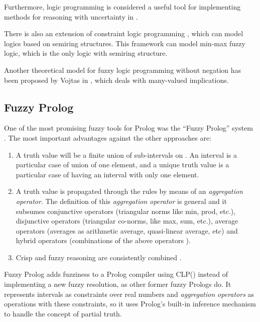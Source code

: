 \documentclass[runningheads,a4paper]{llncs}
\begin{document}
Furthermore, logic programming is considered a useful tool for
implementing methods for reasoning with uncertainty in
\cite{Shapiro83}.

There is also an extension of constraint logic programming
\cite{Bistarelli01}, which can model logics based on semiring
structures. This framework can model min-max fuzzy logic, which is the
only logic with semiring structure.


Another theoretical model for fuzzy logic programming without negation
has been proposed by Vojtas in \cite{Vojt1}, which deals with
many-valued implications.

\subsection{Fuzzy Prolog}
\label{subsec:fuzzy-prolog}


One of the most promising fuzzy tools for Prolog was the ``Fuzzy
Prolog'' system
\cite{Vaucheret_LPAR02,Susana_FSS04}. 
The most important advantages against the other approaches are:
\begin{enumerate}

\item A truth value will be a finite union of sub-intervals on
  . An interval is a particular case of union of one element,
  and a unique truth value is a particular case of having an interval
  with only one element.

\item A truth value is propagated through the rules by means of
  an \emph{aggregation operator}. The definition of this 
  \emph{aggregation operator} is general and 
  it subsumes conjunctive operators (triangular
  norms \cite{Norms00} like min, prod, etc.), disjunctive operators
  \cite{Tri_Cub_Cas} (triangular co-norms, like max, sum, etc.),
  average operators (averages as arithmetic average, quasi-linear
  average, etc) and hybrid operators (combinations of the above
  operators \cite{Prad_Tri_Cal}). 

\item Crisp and fuzzy reasoning are consistently combined 
  \cite{Susana_fuzzyneg_AGP02}.
\end{enumerate}

Fuzzy Prolog adds fuzziness to a Prolog compiler using CLP()
instead of implementing a new fuzzy resolution, as other former fuzzy
Prologs do. 
It represents intervals as constraints over real numbers and 
\emph{aggregation operators} as operations with these constraints,
so it uses Prolog's built-in inference mechanism 
to handle the concept of partial truth. 
\end{document}
